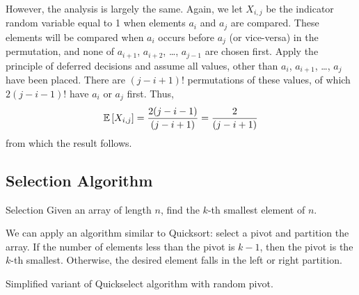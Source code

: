 However, the analysis is largely the same. Again, we let $X_{i,j}$ be the
indicator random variable equal to 1 when elements $a_i$ and $a_j$ are compared.
These elements will be compared when $a_i$ occurs before $a_j$ (or vice-versa)
in the permutation, and none of $a_{i+1}$, $a_{i+2}$, \dots, $a_{j - 1}$ are
chosen first. Apply the principle of deferred decisions and assume all values,
other than $a_i$, $a_{i+1}$, \dots, $a_j$ have been placed. There are $(j - i +
1)!$ permutations of these values, of which $2(j - i - 1)!$ have $a_i$ or $a_j$
first. Thus,
\[\operatorname{\mathbb{E}}\left[X_{i,j}\right] = \frac{2(j - i - 1)}{(j - i + 1)} = \frac{2}{(j - i + 1)}\]
from which the result follows.

\subsection{Selection Algorithm}
\begin{problem}{Selection}{}
    Given an array of length $n$, find the $k$-th smallest element of $n$.
\end{problem}
We can apply an algorithm similar to Quicksort: select a pivot and partition the
array. If the number of elements less than the pivot is $k - 1$, then the pivot
is the $k$-th smallest. Otherwise, the desired element falls in the left or
right partition. 

\begin{algorithm}[H]
    \caption{Simplified variant of Quickselect algorithm with random pivot.}
    \label{alg:randquickselect}
\end{algorithm}